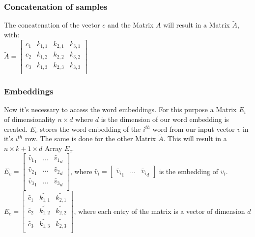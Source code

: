 \subsubsection{Concatenation of samples}
The concatenation of the vector $c$ and the Matrix $A$ will result in a Matrix $\tilde{A}$, with:\\
$\tilde{A} = \begin{bmatrix}
c_1 & k_{1,1} & k_{2,1} & k_{3,1}\\
c_2 & k_{1,2} & k_{2,2} & k_{3,2}\\
c_3 & k_{1,3} & k_{2,3}& k_{3,3}\\
\end{bmatrix}$
\bigskip

\subsubsection{Embeddings}
Now it's necessary to access the word embeddings. For this purpose a Matrix $E_v$ of dimensionality $n \times d$ where $d$ is the dimension of our word embedding is created. $E_v$ stores the word embedding of the $i^{th}$ word from our input vector $v$ in it's $i^{th}$ row. The same is done for the other Matrix $\tilde{A}$. This will result in a $n \times k+1 \times d$ Array $E_c$. \\

$E_v = \begin{bmatrix}
\tilde{v_1}_1 & \ldots & \tilde{v_1}_d\\
\tilde{v_2}_1 & \ldots & \tilde{v_2}_d\\
\tilde{v_3}_1 & \ldots & \tilde{v_3}_d\\
\end{bmatrix}
$, where $\tilde{v_i} = \begin{bmatrix}
\tilde{v_i}_1 & \ldots & \tilde{v_i}_d \end{bmatrix}$ is the embedding of $v_i$. \\

$E_c = \begin{bmatrix}
\tilde{c_1 }& \tilde{k_{1,1}} & \tilde{k_{2,1}} \\
\tilde{c_2 }& \tilde{k_{1,2}}& \tilde{k_{2,2}} \\
\tilde{c_3 }&\tilde{ k_{1,3} }& \tilde{k_{2,3}}\\
\end{bmatrix}$,
where each entry of the matrix is a vector of dimension $d$\\

